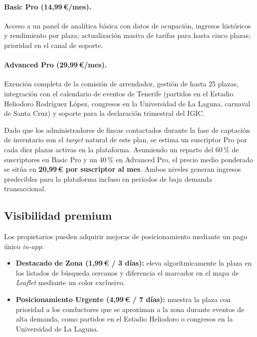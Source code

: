 \paragraph{Basic Pro (14,99\,€/mes).}
Acceso a un panel de analítica básica con datos de ocupación, ingresos históricos y rendimiento por plaza; actualización masiva de tarifas para hasta cinco plazas; prioridad en el canal de soporte.

\paragraph{Advanced Pro (29,99\,€/mes).}
Exención completa de la comisión de arrendador, gestión de hasta 25 plazas, integración con el calendario de eventos de Tenerife (partidos en el Estadio Heliodoro Rodríguez López, congresos en la Universidad de La Laguna, carnaval de Santa Cruz) y soporte para la declaración trimestral del IGIC.

Dado que los administradores de fincas contactados durante la fase de captación de inventario son el \textit{target} natural de este plan, se estima un suscriptor Pro por cada diez plazas activas en la plataforma. Asumiendo un reparto del 60\,\% de suscriptores en Basic Pro y un 40\,\% en Advanced Pro, el precio medio ponderado se sitúa en
\textbf{20,99\,€ por suscriptor al mes}.
Ambos niveles generan ingresos predecibles para la plataforma incluso en períodos de baja demanda transaccional.

\subsection{Visibilidad premium}
\label{subsec:visibilidad_premium}

Los propietarios pueden adquirir mejoras de posicionamiento mediante un pago único \textit{in-app}:

\begin{itemize}
    \item \textbf{Destacado de Zona (1,99\,€ / 3 días):} eleva
          algorítmicamente la plaza en los listados de búsqueda cercanos y diferencia el marcador en el mapa de \textit{Leaflet} mediante un color exclusivo.
    \item \textbf{Posicionamiento Urgente (4,99\,€ / 7 días):}
          muestra la plaza con prioridad a los conductores que se aproximan a la zona durante eventos de alta demanda, como partidos en el Estadio Heliodoro o congresos en la Universidad de La Laguna.
\end{itemize}

